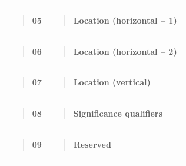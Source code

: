 \begin{longtable}[]{@{}ll@{}}
\begin{minipage}[t]{0.47\columnwidth}
\begin{quote}
\textbf{05}
\end{quote}\strut
\end{minipage} & \begin{minipage}[t]{0.47\columnwidth}\raggedright
\begin{quote}
\textbf{Location (horizontal -- 1)}
\end{quote}\strut
\end{minipage}\tabularnewline
\begin{minipage}[t]{0.47\columnwidth}\raggedright
\begin{quote}
\textbf{06}
\end{quote}\strut
\end{minipage} & \begin{minipage}[t]{0.47\columnwidth}\raggedright
\begin{quote}
\textbf{Location (horizontal -- 2)}
\end{quote}\strut
\end{minipage}\tabularnewline
\begin{minipage}[t]{0.47\columnwidth}\raggedright
\begin{quote}
\textbf{07}
\end{quote}\strut
\end{minipage} & \begin{minipage}[t]{0.47\columnwidth}\raggedright
\begin{quote}
\textbf{Location (vertical)}
\end{quote}\strut
\end{minipage}\tabularnewline
\begin{minipage}[t]{0.47\columnwidth}\raggedright
\begin{quote}
\textbf{08}
\end{quote}\strut
\end{minipage} & \begin{minipage}[t]{0.47\columnwidth}\raggedright
\begin{quote}
\textbf{Significance qualifiers}
\end{quote}\strut
\end{minipage}\tabularnewline
\begin{minipage}[t]{0.47\columnwidth}\raggedright
\begin{quote}
\textbf{09}
\end{quote}\strut
\end{minipage} & \begin{minipage}[t]{0.47\columnwidth}\raggedright
\begin{quote}
\textbf{Reserved}
\end{quote}\strut
\end{minipage}\tabularnewline
\bottomrule
\end{longtable}

